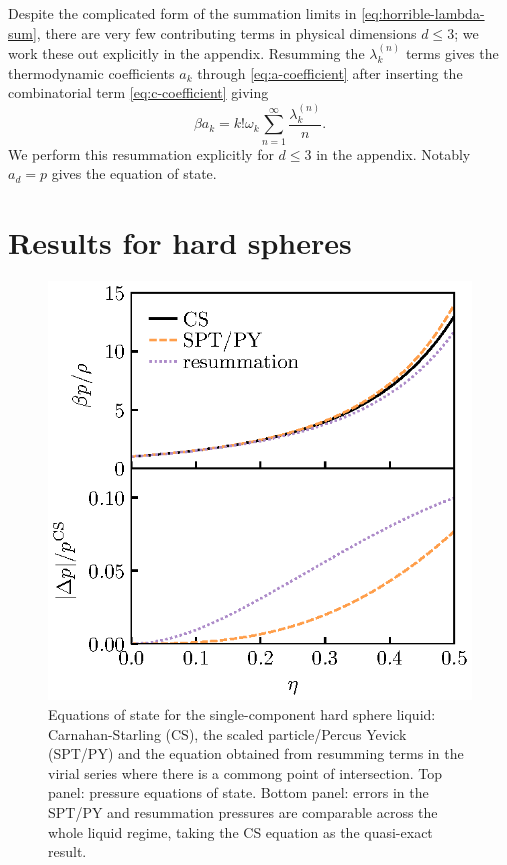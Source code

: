 \documentclass[11pt,twoside]{report}
\begin{document}
Despite the complicated form of the summation limits in \eqref{eq:horrible-lambda-sum}, there are very few contributing terms in physical dimensions $d \le 3$; we work these out explicitly in the appendix.
Resumming the $\lambda_k^{(n)}$ terms gives the thermodynamic coefficients $a_k$ through \eqref{eq:a-coefficient} after inserting the combinatorial term \eqref{eq:c-coefficient} giving
\begin{equation}\label{eq:final-a-coefficient}
  \beta a_k = k! \omega_k \sum_{n=1}^\infty \frac{\lambda_k^{(n)}}{n}.
\end{equation}
We perform this resummation explicitly for $d \le 3$ in the appendix.
Notably $a_d = p$ gives the equation of state.

\section{Results for hard spheres}

\begin{figure}
  \includegraphics[width=0.9\linewidth,outer]{resummation-pressure}
  \caption[Accuracy of equation of state from resumming the virial series]{
    Equations of state for the single-component hard sphere liquid: Carnahan-Starling (CS), the scaled particle/Percus Yevick (SPT/PY) and the equation obtained from resumming terms in the virial series where there is a commong point of intersection.
    Top panel: pressure equations of state.
  Bottom panel: errors in the SPT/PY and resummation pressures are comparable across the whole liquid regime, taking the CS equation as the quasi-exact result.}
  \label{fig:resummation-pressure}
\end{figure}
\end{document}
